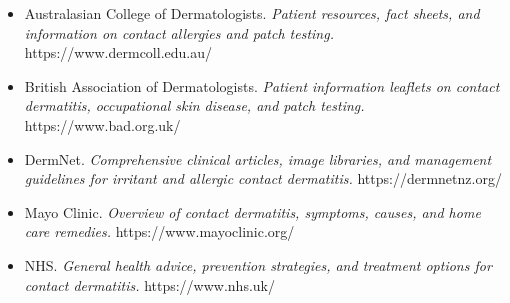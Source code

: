 \begin{itemize}
    \item Australasian College of Dermatologists. \textit{Patient resources, fact sheets, and information on contact allergies and patch testing.} https://www.dermcoll.edu.au/
    \item British Association of Dermatologists. \textit{Patient information leaflets on contact dermatitis, occupational skin disease, and patch testing.} https://www.bad.org.uk/
    \item DermNet. \textit{Comprehensive clinical articles, image libraries, and management guidelines for irritant and allergic contact dermatitis.} https://dermnetnz.org/
    \item Mayo Clinic. \textit{Overview of contact dermatitis, symptoms, causes, and home care remedies.} https://www.mayoclinic.org/
    \item NHS. \textit{General health advice, prevention strategies, and treatment options for contact dermatitis.} https://www.nhs.uk/
\end{itemize}
